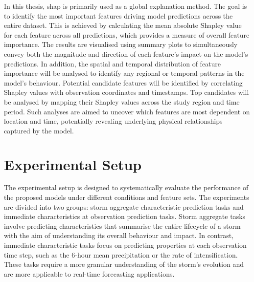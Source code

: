 In this thesis, \acrshort{shap} is primarily used as a global explanation method. The goal is to identify the most important features driving model predictions across the entire dataset. This is achieved by calculating the mean absolute Shapley value for each feature across all predictions, which provides a measure of overall feature importance. The results are visualised using summary plots to simultaneously convey both the magnitude and direction of each feature's impact on the model's predictions. In addition, the spatial and temporal distribution of feature importance will be analysed to identify any regional or temporal patterns in the model's behaviour. Potential candidate features will be identified by correlating Shapley values with observation coordinates and timestamps. Top candidates will be analysed by mapping their Shapley values across the study region and time period. Such analyses are aimed to uncover which features are most dependent on location and time, potentially revealing underlying physical relationships captured by the model.

\section{Experimental Setup}

The experimental setup is designed to systematically evaluate the performance of the proposed models under different conditions and feature sets. The experiments are divided into two groups: storm aggregate characteristic prediction tasks and immediate characteristics at observation prediction tasks. Storm aggregate tasks involve predicting characteristics that summarise the entire lifecycle of a storm with the aim of understanding its overall behaviour and impact. In contrast, immediate characteristic tasks focus on predicting properties at each observation time step, such as the 6-hour mean precipitation or the rate of intensification. These tasks require a more granular understanding of the storm's evolution and are more applicable to real-time forecasting applications.

